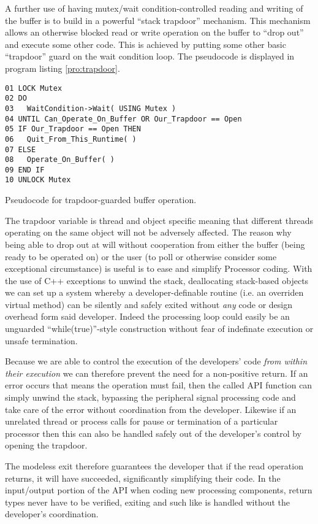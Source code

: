 A further use of having mutex/wait condition-controlled reading and writing of the buffer is to build in a powerful ``stack trapdoor'' mechanism. This mechanism allows an otherwise blocked read or write operation on the buffer to ``drop out'' and execute some other code. This is achieved by putting some other basic ``trapdoor'' guard on the wait condition loop. The pseudocode is displayed in program listing \ref{pro:trapdoor}.

\begin{program}
\begin{verbatim}
01 LOCK Mutex
02 DO
03   WaitCondition->Wait( USING Mutex )
04 UNTIL Can_Operate_On_Buffer OR Our_Trapdoor == Open
05 IF Our_Trapdoor == Open THEN
06   Quit_From_This_Runtime( )
07 ELSE
08   Operate_On_Buffer( )
09 END IF
10 UNLOCK Mutex
\end{verbatim}
\caption{Pseudocode for trapdoor-guarded buffer operation.}
\label{pro:trapdoor}
\end{program}

The trapdoor variable is thread and object specific meaning that different threads operating on the same object will not be adversely affected. The reason why being able to drop out at will without cooperation from either the buffer (being ready to be operated on) or the user (to poll or otherwise consider some exceptional circumstance) is useful is to ease and simplify Processor coding. With the use of C++ exceptions to unwind the stack, deallocating stack-based objects we can set up a system whereby a developer-definable routine (i.e. an overriden virtual method) can be silently and safely exited without \textit{any} code or design overhead form said developer. Indeed the processing loop could easily be an unguarded ``while(true)''-style construction without fear of indefinate execution or unsafe termination.

Because we are able to control the execution of the developers' code \textit{from within their execution} we can therefore prevent the need for a non-positive return. If an error occurs that means the operation must fail, then the called API function can simply unwind the stack, bypassing the peripheral signal processing code and take care of the error without coordination from the developer. Likewise if an unrelated thread or process calls for pause or termination of a particular processor then this can also be handled safely out of the developer's control by opening the trapdoor.

The modeless exit therefore guarantees the developer that if the read operation returns, it will have succeeded, significantly simplifying their code. In the input/output portion of the API when coding new processing components, return types never have to be verified, exiting and such like is handled without the developer's coordination.

